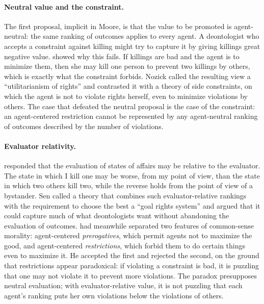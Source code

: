 \documentclass{situationist-preprint}
\begin{document}
\paragraph{Neutral value and the constraint.} The first proposal, implicit in Moore, is that the value to be promoted is agent-neutral: the same ranking of outcomes applies to every agent. A deontologist who accepts a constraint against killing might try to capture it by giving killings great negative value. \citet{Nozick1974} showed why this fails. If killings are bad and the agent is to minimize them, then she may kill one person to prevent two killings by others, which is exactly what the constraint forbids. Nozick called the resulting view a ``utilitarianism of rights'' and contrasted it with a theory of side constraints, on which the agent is not to violate rights herself, even to minimize violations by others. The case that defeated the neutral proposal is the case of the constraint: an agent-centered restriction cannot be represented by any agent-neutral ranking of outcomes described by the number of violations.

\paragraph{Evaluator relativity.} \citet{Sen1982} responded that the evaluation of states of affairs may be relative to the evaluator. The state in which I kill one may be worse, from my point of view, than the state in which two others kill two, while the reverse holds from the point of view of a bystander. Sen called a theory that combines such evaluator-relative rankings with the requirement to choose the best a ``goal rights system'' and argued that it could capture much of what deontologists want without abandoning the evaluation of outcomes. \citet{Scheffler1982} had meanwhile separated two features of common-sense morality: agent-centered \emph{prerogatives}, which permit agents not to maximize the good, and agent-centered \emph{restrictions}, which forbid them to do certain things even to maximize it. He accepted the first and rejected the second, on the ground that restrictions appear paradoxical: if violating a constraint is bad, it is puzzling that one may not violate it to prevent more violations. The paradox presupposes neutral evaluation; with evaluator-relative value, it is not puzzling that each agent's ranking puts her own violations below the violations of others.
\end{document}

